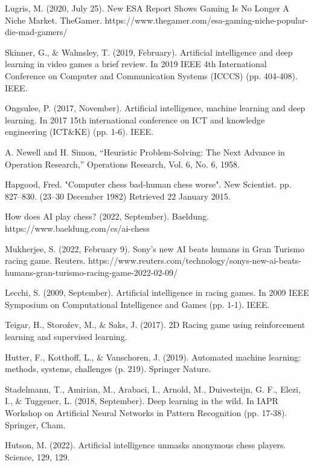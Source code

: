 \documentclass[conference]{IEEEtran}
\begin{document}
\begin{thebibliography}{00}

 Lugris, M. (2020, July 25). New ESA Report Shows Gaming Is No Longer A Niche Market. TheGamer. https://www.thegamer.com/esa-gaming-niche-popular-die-mad-gamers/

 Skinner, G.,  $\&$ Walmsley, T. (2019, February). Artificial intelligence and deep learning in video games a brief review. In 2019 IEEE 4th International Conference on Computer and Communication Systems (ICCCS) (pp. 404-408). IEEE.

 Ongsulee, P. (2017, November). Artificial intelligence, machine learning and deep learning. In 2017 15th international conference on ICT and knowledge engineering (ICT$\&$KE) (pp. 1-6). IEEE.

 A. Newell and H. Simon, “Heuristic Problem-Solving: The Next Advance in Operation Research,” Operations Research, Vol. 6, No. 6, 1958. 

 Hapgood, Fred. "Computer chess bad-human chess worse". New Scientist. pp. 827–830. (23–30 December 1982) Retrieved 22 January 2015.

How does AI play chess? (2022, September). Baeldung. https://www.baeldung.com/cs/ai-chess

 Mukherjee, S. (2022, February 9). Sony’s new AI beats humans in Gran Turismo racing game. Reuters. https://www.reuters.com/technology/sonys-new-ai-beats-humans-gran-turismo-racing-game-2022-02-09/

 Lecchi, S. (2009, September). Artificial intelligence in racing games. In 2009 IEEE Symposium on Computational Intelligence and Games (pp. 1-1). IEEE.

 Teigar, H., Storožev, M., $\&$ Saks, J. (2017). 2D Racing game using reinforcement learning and supervised learning.

 Hutter, F., Kotthoff, L., $\&$ Vanschoren, J. (2019). Automated machine learning: methods, systems, challenges (p. 219). Springer Nature.

 Stadelmann, T., Amirian, M., Arabaci, I., Arnold, M., Duivesteijn, G. F., Elezi, I., $\&$ Tuggener, L. (2018, September). Deep learning in the wild. In IAPR Workshop on Artificial Neural Networks in Pattern Recognition (pp. 17-38). Springer, Cham.

 Hutson, M. (2022). Artificial intelligence unmasks anonymous chess players. Science, 129, 129.


\end{thebibliography}
\end{document}
